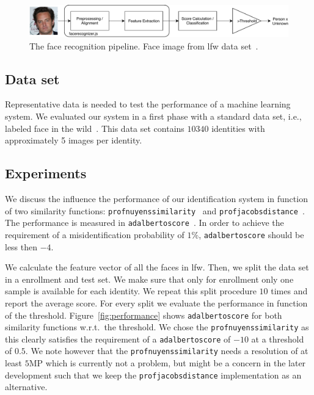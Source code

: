 \documentclass[a4paper,11pt]{article}
\begin{document}
{\begin{figure}
	\centering
	\includegraphics[width=\textwidth]{figures/identification}
	\caption{The face recognition pipeline. Face image from \textsf{lfw} data set~\cite{LFWTech}.} 
	\label{fig:identification}
\end{figure}

\subsection{Data set}

Representative data is needed to test the performance of a machine learning system. We evaluated our system in a first phase with a standard data set, i.e., labeled face in the wild~\cite{LFWTech}. This data set contains $10340$ identities with approximately 5 images per identity.

\subsection{Experiments}\label{sec:experimenten}

We discuss the influence the performance of our identification system in function of two similarity functions: \texttt{profnuyenssimilarity}~\cite{nuyens:2018} and \texttt{profjacobsdistance}~\cite{jacobs:2015}. The performance is measured in \texttt{adalbertoscore}~\cite{vanhamme:1991}. In order to achieve the requirement of a misidentification probability of $1$\%, \texttt{adalbertoscore} should be less then $-4$.

We calculate the feature vector of all the faces in \textsf{lfw}. Then, we split the data set in a enrollment and test set. We make sure that only for enrollment only one sample is available for each identity. We repeat this split procedure $10$ times and report the average score. For every split we evaluate the performance in function of the threshold. Figure~\ref{fig:performance} shows \texttt{adalbertoscore} for both similarity functions w.r.t.\ the threshold. We chose the \texttt{profnuyenssimilarity} as this clearly satisfies the requirement of a \texttt{adalbertoscore} of $-10$ at a threshold of $0.5$.
We note however that the \texttt{profnuyenssimilarity} needs a resolution of at least $5$MP which is currently not a problem, but might be a concern in the later development such that we keep the \texttt{profjacobsdistance} implementation as an alternative.

}
\end{document}
